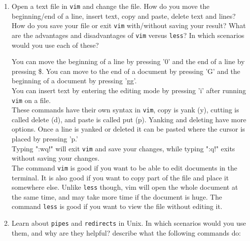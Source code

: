 \documentclass[11pt]{article}
\begin{document}
\begin{enumerate}
	\item Open a text file in \texttt{vim} and change the file. How do you move the beginning/end of a line, insert text, copy and paste, delete text and lines? How do you save your file or exit \texttt{vim} with/without saving your result? What are the advantages and disadvantages of \texttt{vim} versus \texttt{less}? In which scenarios would you use each of these? 
	
	You can move the beginning of a line by pressing '0' and the end of a line by pressing \$. You can move to the end of a document by pressing 'G' and the beginning of a document by pressing 'gg'. \\ 
	You can insert text by entering the editing mode by pressing 'i' after running \texttt{vim} on a file. \\
	These commands have their own syntax in \texttt{vim}, copy is yank (y), cutting is called delete (d),  and paste is called put (p). Yanking and deleting have more options. Once a line is yanked or deleted it can be pasted where the cursor is placed by pressing 'p.'\\
	Typing ":wq!" will exit \texttt{vim} and save your changes, while typing ":q!" exits without saving your changes. \\
	The command \texttt{vim} is good if you want to be able to edit documents in the terminal. It is also good if you want to copy part of the file and place it somewhere else. Unlike \texttt{less} though, vim will open the whole document at the same time, and may take more time if the document is huge. The command \texttt{less} is good if you want to view the file without editing it.  
	
	\newpage
	
	\item Learn about \texttt{pipes} and \texttt{redirects} in Unix. In which scenarios would you use them, and why are they helpful? describe what the following commands do:
	

\end{enumerate}
\end{document}
